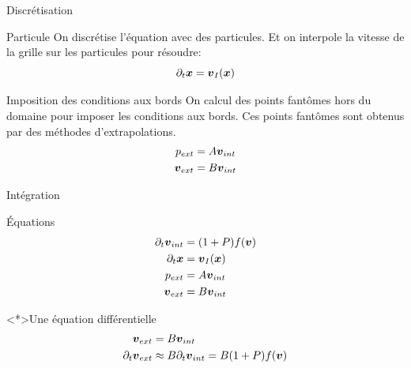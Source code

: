 \begin{frame}[<+->]{Discrétisation}
\begin{block}{Particule}
 On discrétise l'équation avec des particules.
 Et on interpole la vitesse de la grille sur les particules pour résoudre:
   \begin{equation*}
   \partial_{t}{\boldsymbol {x}}={\boldsymbol {v}}_{I}({\boldsymbol {x}})
  \end{equation*}
\end{block}
\begin{block}{Imposition des conditions aux bords}
On calcul des points fantômes hors du domaine pour imposer les conditions aux bords.
Ces points fantômes sont obtenus par des méthodes d'extrapolations.
\begin{align*}
 p_{ext}&=A{\boldsymbol {v}}_{int}\\
 {\boldsymbol {v}}_{ext}&=B{\boldsymbol {v}}_{int}
\end{align*}
\end{block}

\end{frame}

\begin{frame}[<+->]{Intégration}
 \begin{block}{Équations}
  \begin{align*}
    \partial_t{\boldsymbol {v}}_{int}&=(1+P)f({\boldsymbol {v}})\\
    \partial_t{\boldsymbol {x}}&={\boldsymbol {v}}_{I}({\boldsymbol {x}})\\
     p_{ext}&=A{\boldsymbol {v}}_{int}\\
 {\boldsymbol {v}}_{ext}&=B{\boldsymbol {v}}_{int}
  \end{align*}
 \end{block}
 
\begin{block}<*>{Une équation différentielle}
 \begin{align*}
  {\boldsymbol {v}}_{ext}&=B{\boldsymbol {v}}_{int}\\
  \partial_t{\boldsymbol {v}}_{ext}&\approx B\partial_t{\boldsymbol {v}}_{int}=B(1+P)f({\boldsymbol {v}})
 \end{align*}
\end{block}

\end{frame}

